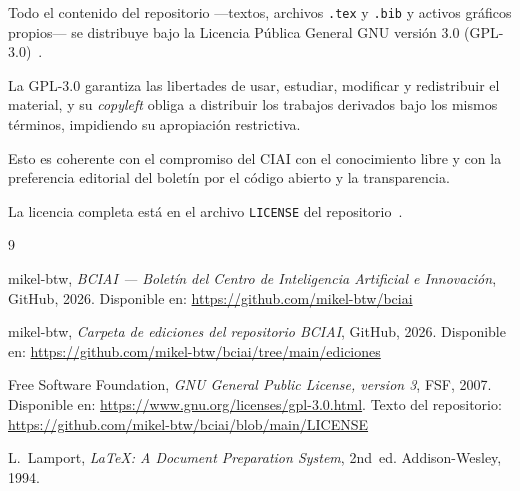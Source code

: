 \documentclass[conference,twocolumn,spanish]{IEEEtran}
\begin{document}
Todo el contenido del repositorio ---textos, archivos \texttt{.tex} y
\texttt{.bib} y activos gráficos propios--- se distribuye bajo la Licencia
Pública General GNU versión 3.0 (GPL-3.0)~\cite{licencia}.

La GPL-3.0 garantiza las libertades de usar, estudiar, modificar y
redistribuir el material, y su \textit{copyleft} obliga a distribuir los
trabajos derivados bajo los mismos términos, impidiendo su apropiación
restrictiva.

Esto es coherente con el compromiso del CIAI con el conocimiento libre y
con la preferencia editorial del boletín por el código abierto y la
transparencia.

La licencia completa está en el archivo \texttt{LICENSE} del
repositorio~\cite{licencia}.

\begin{thebibliography}{9}

  mikel-btw,
  \textit{BCIAI --- Boletín del Centro de Inteligencia Artificial e
  Innovación},
  GitHub, 2026.
  Disponible en: \url{https://github.com/mikel-btw/bciai}

  mikel-btw,
  \textit{Carpeta de ediciones del repositorio BCIAI},
  GitHub, 2026.
  Disponible en:
  \url{https://github.com/mikel-btw/bciai/tree/main/ediciones}

  Free Software Foundation,
  \textit{GNU General Public License, version 3},
  FSF, 2007.
  Disponible en: \url{https://www.gnu.org/licenses/gpl-3.0.html}.
  Texto del repositorio:
  \url{https://github.com/mikel-btw/bciai/blob/main/LICENSE}

  L.~Lamport,
  \textit{\LaTeX: A Document Preparation System},
  2nd~ed.
  Addison-Wesley, 1994.

\end{thebibliography}
\end{document}
